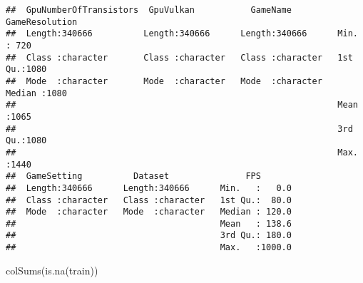 \documentclass[
]{article}
\newenvironment{Shaded}{\begin{snugshade}}{\end{snugshade}}
\newcommand{\FunctionTok}[1]{\textcolor[rgb]{0.00,0.00,0.00}{#1}}
\newcommand{\NormalTok}[1]{#1}
\begin{document}
\begin{verbatim}
##  GpuNumberOfTransistors  GpuVulkan           GameName         GameResolution
##  Length:340666          Length:340666      Length:340666      Min.   : 720  
##  Class :character       Class :character   Class :character   1st Qu.:1080  
##  Mode  :character       Mode  :character   Mode  :character   Median :1080  
##                                                               Mean   :1065  
##                                                               3rd Qu.:1080  
##                                                               Max.   :1440  
##  GameSetting          Dataset               FPS        
##  Length:340666      Length:340666      Min.   :   0.0  
##  Class :character   Class :character   1st Qu.:  80.0  
##  Mode  :character   Mode  :character   Median : 120.0  
##                                        Mean   : 138.6  
##                                        3rd Qu.: 180.0  
##                                        Max.   :1000.0
\end{verbatim}

\begin{Shaded}
\begin{Highlighting}[]
\FunctionTok{colSums}\NormalTok{(}\FunctionTok{is.na}\NormalTok{(train))}
\end{Highlighting}
\end{Shaded}
\end{document}
